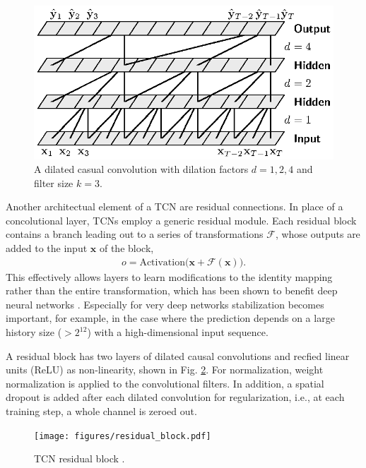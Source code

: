 \documentclass{scrartcl}
\begin{document}
\begin{figure}[htbp]
\centering
\includegraphics[scale=1]{figures/dilated_conv.eps}
\caption{A dilated casual convolution with dilation factors $d = 1,2,4$ and filter size $k=3$.}
\label{fig:dilated_convolutions} 
\end{figure}

Another architectual element of a TCN are residual connections. In place of a concolutional layer, TCNs employ a generic residual module. Each residual block contains a branch leading out to a series of transformations $\mathcal F$, whose outputs are added to the input $\mathbf x$ of the block, 
\begin{align}
o = \text{Activation} \big(\mathbf x + \mathcal F(\mathbf x)\big).
\end{align}
This effectively allows layers to learn modifications to the identity mapping rather than the entire transformation, which has been shown to benefit deep neural networks \cite{He2016}. Especially for very deep networks stabilization becomes important, for example, in the case where the prediction depends on a large history size ($> 2^{12}$) with a high-dimensional input sequence. 

A residual block has two layers of dilated causal convolutions and recfied linear units (ReLU) as non-linearity, shown in Fig. \ref{fig:residual_block}. For normalization, weight normalization \cite{Salimans2016} is applied to the convolutional filters. In addition, a spatial dropout \cite{Srivastava2014} is added after each dilated convolution for regularization, i.e., at each training step, a whole channel is zeroed out.
\begin{figure}[htbp]
    \centering
    \texttt{[image: figures/residual\_block.pdf]}
    \caption{TCN residual block \cite{Bai2018}.}
    \label{fig:residual_block} 
\end{figure}
\end{document}
